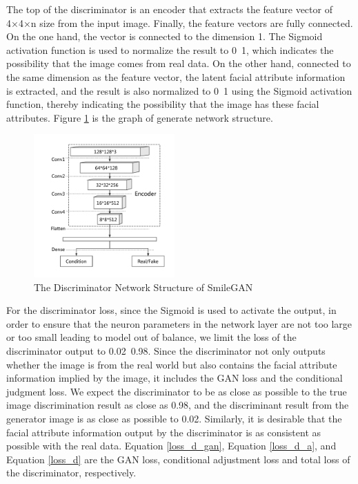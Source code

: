 The top of the discriminator is an encoder that extracts the feature vector of 4×4×n size from the input image.
Finally, the feature vectors are fully connected.
On the one hand, the vector is connected to the dimension 1.
The Sigmoid activation function is used to normalize the result to 0~1,
    which indicates the possibility that the image comes from real data.
On the other hand, connected to the same dimension as the feature vector,
    the latent facial attribute information is extracted,
    and the result is also normalized to 0~1 using the Sigmoid activation function,
    thereby indicating the possibility that the image has these facial attributes.
Figure \ref{net_discriminator} is the graph of generate network structure.

\begin{figure}
    \begin{center}
    \includegraphics[width=0.48\textwidth]{figures/net_discriminator.pdf}
    \caption{The Discriminator Network Structure of SmileGAN}
    \label{net_discriminator}
    \end{center}
\end{figure}

For the discriminator loss, since the Sigmoid is used to activate the output,
    in order to ensure that the neuron parameters in the network layer are not too large or too small leading to model out of balance,
    we limit the loss of the discriminator output to 0.02~0.98.
Since the discriminator not only outputs whether the image is from the real world but also contains the facial attribute information implied by the image,
    it includes the GAN loss and the conditional judgment loss.
We expect the discriminator to be as close as possible to the true image discrimination result as close as 0.98,
    and the discriminant result from the generator image is as close as possible to 0.02.
Similarly, it is desirable that the facial attribute information output by the discriminator is as consistent as possible with the real data.
Equation \eqref{loss_d_gan}, Equation \eqref{loss_d_a}, and Equation \eqref{loss_d} are the GAN loss, conditional adjustment loss and total loss of the discriminator, respectively.


